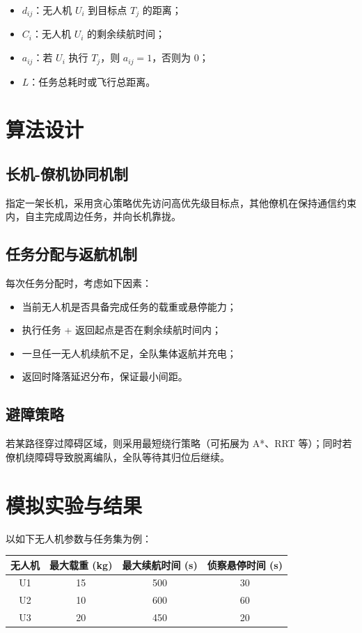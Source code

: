 \documentclass[12pt,fontset=adobe]{ctexart}
\begin{document}
\begin{itemize}
    \item $d_{ij}$：无人机 $U_i$ 到目标点 $T_j$ 的距离；
    \item $C_i$：无人机 $U_i$ 的剩余续航时间；
    \item $a_{ij}$：若 $U_i$ 执行 $T_j$，则 $a_{ij} = 1$，否则为 0；
    \item $L$：任务总耗时或飞行总距离。
\end{itemize}

\section{算法设计}

\subsection{长机-僚机协同机制}
指定一架长机，采用贪心策略优先访问高优先级目标点，其他僚机在保持通信约束内，自主完成周边任务，并向长机靠拢。

\subsection{任务分配与返航机制}
每次任务分配时，考虑如下因素：
\begin{itemize}
    \item 当前无人机是否具备完成任务的载重或悬停能力；
    \item 执行任务 + 返回起点是否在剩余续航时间内；
    \item 一旦任一无人机续航不足，全队集体返航并充电；
    \item 返回时降落延迟分布，保证最小间距。
\end{itemize}

\subsection{避障策略}
若某路径穿过障碍区域，则采用最短绕行策略（可拓展为 A*、RRT 等）；同时若僚机绕障碍导致脱离编队，全队等待其归位后继续。

\section{模拟实验与结果}
以如下无人机参数与任务集为例：

\begin{center}
\begin{tabular}{|c|c|c|c|}
\hline
无人机 & 最大载重 (kg) & 最大续航时间 (s) & 侦察悬停时间 (s) \\
\hline
U1 & 15 & 500 & 30 \\
U2 & 10 & 600 & 60 \\
U3 & 20 & 450 & 20 \\
\hline
\end{tabular}
\end{center}
\end{document}
